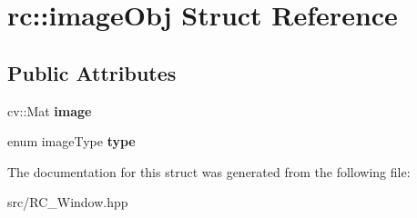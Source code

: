 \hypertarget{structrc_1_1imageObj}{\section{rc\+:\+:image\+Obj Struct Reference}
\label{structrc_1_1imageObj}
}
\subsection*{Public Attributes}
\begin{DoxyCompactItemize}
\item 
\hypertarget{structrc_1_1imageObj_ab0e4bbd77dcb10ec7f115fab9972305c}{cv\+::\+Mat {\bfseries image}}\label{structrc_1_1imageObj_ab0e4bbd77dcb10ec7f115fab9972305c}

\item 
\hypertarget{structrc_1_1imageObj_a74a6a931dfe3696d0062b1f55be935ff}{enum image\+Type {\bfseries type}}\label{structrc_1_1imageObj_a74a6a931dfe3696d0062b1f55be935ff}

\end{DoxyCompactItemize}


The documentation for this struct was generated from the following file\+:\begin{DoxyCompactItemize}
\item 
src/R\+C\+\_\+\+Window.\+hpp\end{DoxyCompactItemize}

